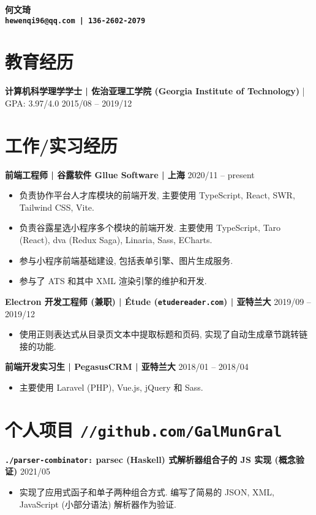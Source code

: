 \documentclass[10 pt]{article}
\begin{document}
\begin{center}
\textbf{\huge 何文琦}\\
\vspace{0.2em}
\textbf{\texttt{hewenqi96@qq.com | 136-2602-2079 }}
\end{center}

\section*{教育经历}
\textbf{计算机科学理学学士 | 佐治亚理工学院 (Georgia Institute of Technology)} | GPA: 3.97/4.0 \hfill 2015/08 -- 2019/12

\section*{工作/实习经历}
\textbf{前端工程师 | 谷露软件 Gllue Software | 上海} \hfill 2020/11 -- present
\begin{itemize}
\item 负责协作平台人才库模块的前端开发, 主要使用 TypeScript, React, SWR, Tailwind CSS, Vite.
\item 负责谷露星选小程序多个模块的前端开发. 主要使用 TypeScript, Taro (React), dva (Redux Saga), Linaria, Sass, ECharts.
\item 参与小程序前端基础建设, 包括表单引擎、图片生成服务.
\item 参与了 ATS 和其中 XML 渲染引擎的维护和开发.
\end{itemize}

\textbf{Electron 开发工程师 (兼职) | Étude (\texttt{etudereader.com}) | 亚特兰大} \hfill 2019/09 -- 2019/12
\begin{itemize}
\item 使用正则表达式从目录页文本中提取标题和页码, 实现了自动生成章节跳转链接的功能.
\end{itemize}

\textbf{前端开发实习生 | PegasusCRM | 亚特兰大} \hfill 2018/01 -- 2018/04
\begin{itemize}
\item 主要使用 Laravel (PHP), Vue.js, jQuery 和 Sass.
\end{itemize} 

\section*{个人项目 \texttt{\large //github.com/GalMunGral}}

\textbf{\texttt{./parser-combinator:}  parsec (Haskell) 式解析器组合子的 JS 实现  (概念验证)} \hfill 2021/05
\begin{itemize}
\item 实现了应用式函子和单子两种组合方式. 编写了简易的 JSON, XML, JavaScript (小部分语法) 解析器作为验证.
\end{itemize}
\end{document}
